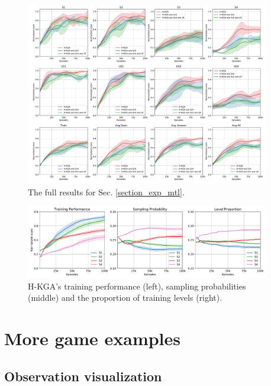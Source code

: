 \documentclass[11pt]{article}
\begin{document}
\begin{figure}[htb]
\centering
\includegraphics[width=0.95\textwidth]{exp3sup_woMTL.pdf}
\caption{The full results for Sec. \ref{section_exp_mtl}. }
\label{exp3sup_woMTL}
\end{figure}

\begin{figure}[htb]
\centering
\includegraphics[width=0.95\textwidth]{exp4sup_sampling.pdf}
\caption{H-KGA's training performance (left), sampling probabilities (middle) and the proportion of training levels (right). }
\label{exp4sup_sampling}
\end{figure}


\clearpage
\section{More game examples \label{appendix_more_game_examples}}

\subsection{Observation visualization \label{app_app_observation_visualization}}
\end{document}
